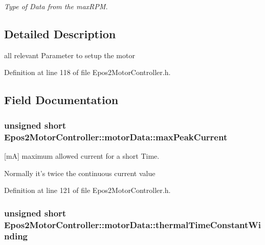 \begin{DoxyCompactItemize}
\begin{DoxyCompactList}\small\item\em Type of Data from the max\-R\-P\-M. \end{DoxyCompactList}\end{DoxyCompactItemize}


\subsection{Detailed Description}
all relevant Parameter to setup the motor 

Definition at line 118 of file Epos2\-Motor\-Controller.\-h.



\subsection{Field Documentation}
\hypertarget{structEpos2MotorController_1_1motorData_a44b2f3a2b69c0d354865934df1aa9b26}{
\subsubsection[{max\-Peak\-Current}]{\setlength{\rightskip}{0pt plus 5cm}unsigned short Epos2\-Motor\-Controller\-::motor\-Data\-::max\-Peak\-Current}}\label{structEpos2MotorController_1_1motorData_a44b2f3a2b69c0d354865934df1aa9b26}


\mbox{[}m\-A\mbox{]} maximum allowed current for a short Time. 

Normally it's twice the continuous current value 

Definition at line 121 of file Epos2\-Motor\-Controller.\-h.

\hypertarget{structEpos2MotorController_1_1motorData_a97bb3cd026f3bd970ded43a91ed3a5cc}{
\subsubsection[{thermal\-Time\-Constant\-Winding}]{\setlength{\rightskip}{0pt plus 5cm}unsigned short Epos2\-Motor\-Controller\-::motor\-Data\-::thermal\-Time\-Constant\-Winding}}\label{structEpos2MotorController_1_1motorData_a97bb3cd026f3bd970ded43a91ed3a5cc}


